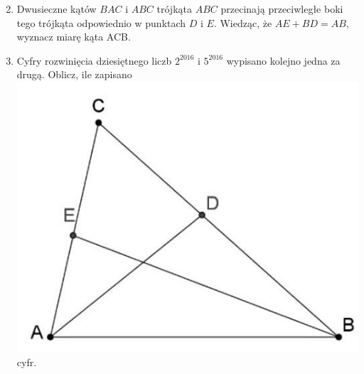 \documentclass[10pt]{article}
\begin{document}
\begin{enumerate}
  \setcounter{enumi}{1}
  \item Dwusieczne kątów \(B A C\) i \(A B C\) trójkąta \(A B C\) przecinają przeciwległe boki tego trójkąta odpowiednio w punktach \(D\) i \(E\). Wiedząc, że \(A E+B D=A B\), wyznacz miarę kąta ACB.
  \item Cyfry rozwinięcia dziesiętnego liczb \(2^{2016}\) i \(5^{2016}\) wypisano kolejno jedna za drugą. Oblicz, ile zapisano\\
\includegraphics[max width=\textwidth, center]{2024_11_21_913e907bded18b80a017g-1}\\
cyfr.
\end{enumerate}
\end{document}
